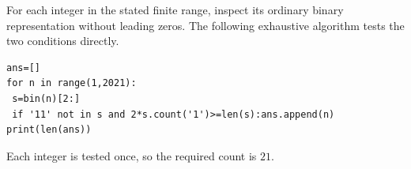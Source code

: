 For each integer in the stated finite range, inspect its ordinary binary representation without leading zeros. The following exhaustive algorithm tests the two conditions directly.\begin{verbatim}
ans=[]
for n in range(1,2021):
 s=bin(n)[2:]
 if '11' not in s and 2*s.count('1')>=len(s):ans.append(n)
print(len(ans))
\end{verbatim}
Each integer is tested once, so the required count is $\boxed{21}$.
